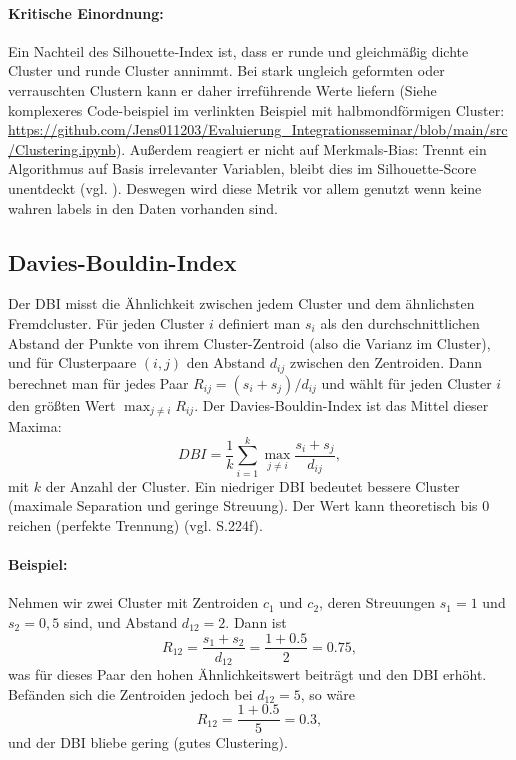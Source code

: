 \paragraph{Kritische Einordnung:}
Ein Nachteil des Silhouette‐Index ist, dass er runde und gleichmäßig dichte Cluster und runde
Cluster annimmt. Bei stark ungleich geformten oder  
verrauschten Clustern kann er daher irreführende Werte liefern (Siehe komplexeres Code-beispiel im verlinkten Beispiel mit halbmondförmigen Cluster: \url{https://github.com/Jens011203/Evaluierung_Integrationsseminar/blob/main/src/Clustering.ipynb}).
Außerdem reagiert er nicht auf Merkmals‑Bias: Trennt ein Algorithmus auf Basis irrelevanter Variablen,  
bleibt dies im Silhouette‑Score unentdeckt (vgl. \cite{Miller2024}). Deswegen wird diese Metrik vor allem genutzt wenn keine wahren labels in den Daten vorhanden sind.

\subsection{Davies-Bouldin-Index} Der \ac{DBI} misst
die Ähnlichkeit zwischen jedem
Cluster und dem ähnlichsten Fremdcluster. Für jeden Cluster $i$ definiert
man $s_i$ als den durchschnittlichen Abstand der Punkte von ihrem
Cluster-Zentroid (also die Varianz im Cluster), und für Clusterpaare $(i,j)$ den Abstand $d_{ij}$ zwischen
den Zentroiden. Dann berechnet man für jedes Paar $R_{ij} = (s_i + s_j)/d_{ij}$
und wählt für jeden Cluster $i$ den größten Wert $\max_{j\neq i} R_{ij}$. Der
Davies-Bouldin-Index ist das Mittel dieser Maxima: 
\[ DBI = \frac{1}{k}\sum_{i=1}^k \max_{j\neq i}\frac{s_i + s_j}{d_{ij}}, \]
mit $k$ der Anzahl der Cluster. Ein niedriger \ac{DBI} bedeutet bessere Cluster (maximale
Separation und geringe Streuung). Der Wert kann theoretisch bis $0$ reichen
(perfekte Trennung) (vgl. \cite{Davies1979} S.224f).

\paragraph{Beispiel:} Nehmen wir zwei Cluster mit Zentroiden \(c_1\) und \(c_2\),
deren Streuungen \(s_1=1\) und \(s_2=0{,}5\) sind, und Abstand \(d_{12}=2\). Dann ist
\[
R_{12}=\frac{s_1 + s_2}{d_{12}} = \frac{1 + 0.5}{2} = 0.75,
\]
was für dieses Paar den hohen Ähnlichkeitswert beiträgt und den DBI erhöht.
Befänden sich die Zentroiden jedoch bei \(d_{12}=5\), so wäre  
\[
R_{12} = \frac{1 + 0.5}{5} = 0.3,
\]
und der \ac{DBI} bliebe gering (gutes Clustering).

